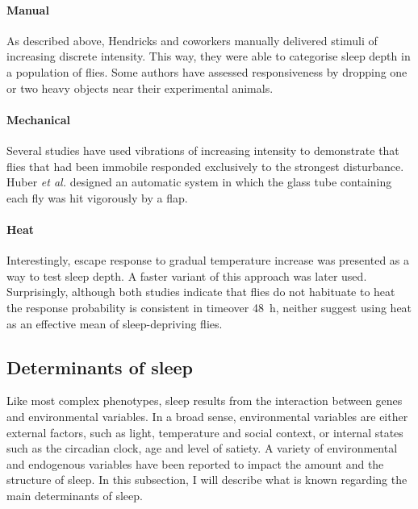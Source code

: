 \paragraph*{Manual}
As described above, Hendricks and coworkers  manually delivered stimuli of increasing discrete intensity\cite{hendricks_rest_2000}.
This way, they were able to categorise sleep depth in a population of flies.
Some authors have assessed responsiveness by dropping one or two heavy objects near their experimental animals\cite{dilley_behavioral_2018}.


\paragraph*{Mechanical}
Several studies have used vibrations of increasing intensity to demonstrate that flies that had been immobile responded exclusively to the strongest disturbance\cite{shaw_correlates_2000,faville_how_2015}.
Huber \emph{et al.} designed an automatic system in which the glass tube containing each fly was hit vigorously by a flap\cite[fig.~1A]{huber_sleep_2004}.


\paragraph*{Heat}
Interestingly, escape response to gradual temperature increase was presented as a way to test sleep depth\cite[fig.~1D]{huber_sleep_2004, cirelli_reduced_2005}.
A faster variant of this approach was later used\cite{bushey_drosophila_2007}.
Surprisingly, although both studies indicate that flies do not habituate to heat\emd{}\ie{} the response probability is consistent in time\emd{}over 48~h, neither suggest using heat as an effective mean of sleep-depriving flies.


\subsection{Determinants of sleep}
\label{sec:sleep-determinants}
Like most complex phenotypes, sleep results from the interaction between genes and environmental variables.
In a broad sense, environmental variables are either external factors, such as light, temperature and social context, or
internal states such as the circadian clock, age and level of satiety.
A variety of environmental and endogenous variables have been reported to impact the amount and the structure of sleep.
In this subsection, I will describe what is known regarding the main determinants of sleep.

